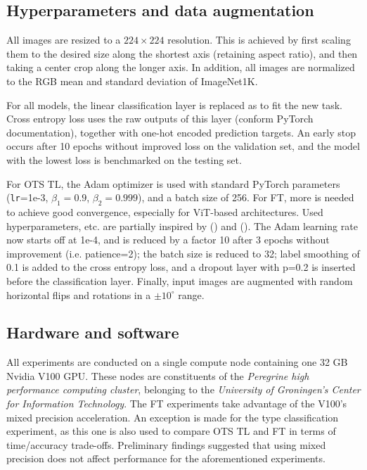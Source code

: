 
\subsection{Hyperparameters and data augmentation}
All images are resized to a $224 \times 224$ resolution. This is achieved by first scaling them to the desired size along the shortest axis (retaining aspect ratio), and then taking a center crop along the longer axis. In addition, all images are normalized to the RGB mean and standard deviation of ImageNet1K.

For all models, the linear classification layer is replaced as to fit the new task. Cross entropy loss uses the raw outputs of this layer (conform PyTorch documentation), together with one-hot encoded prediction targets. An early stop occurs after 10 epochs without improved loss on the validation set, and the model with the lowest loss is benchmarked on the testing set.

For OTS TL, the Adam optimizer is used with standard PyTorch parameters (\texttt{lr}=1e-3, $\beta_1=0.9$, $\beta_2=0.999$), and a batch size of 256. For FT, more is needed to achieve good convergence, especially for ViT-based architectures. Used hyperparameters, etc. are partially inspired by \citeauthor{matsoukas2021time} (\citeyear{matsoukas2021time}) and \citeauthor{zhou2021convnets} (\citeyear{zhou2021convnets}). The Adam learning rate now starts off at 1e-4, and is reduced by a factor 10 after 3 epochs without improvement (i.e. patience=2); the batch size is reduced to 32; label smoothing of 0.1 is added to the cross entropy loss, and a dropout layer with p=0.2 is inserted before the classification layer. Finally, input images are augmented with random horizontal flips and rotations in a $\pm 10 ^\circ$ range.

\subsection{Hardware and software}
All experiments are conducted on a single compute node containing one 32 GB Nvidia V100 GPU. These nodes are constituents of the \textit{Peregrine high performance computing cluster}, belonging to the \textit{University of Groningen's Center for Information Technology}. The FT experiments take advantage of the V100's mixed precision acceleration. An exception is made for the type classification experiment, as this one is also used to compare OTS TL and FT in terms of time/accuracy trade-offs. Preliminary findings suggested that using mixed precision does not affect performance for the aforementioned experiments.

